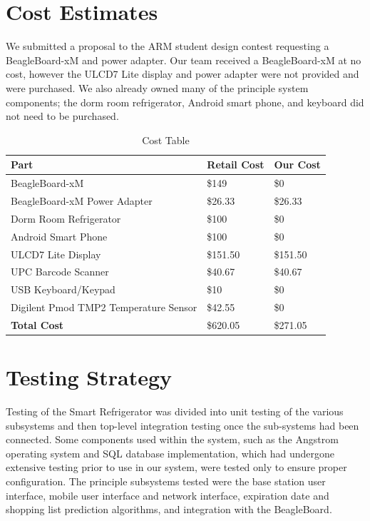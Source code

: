\documentclass[11pt]{article} %
\begin{document}
\section{Cost Estimates}
We submitted a proposal to the ARM student design contest requesting a BeagleBoard-xM and power adapter. Our team received a BeagleBoard-xM at no cost, however the ULCD7 Lite display and power adapter were not provided and were purchased. We also already owned many of the principle system components; the dorm room refrigerator, Android smart phone, and keyboard did not need to be purchased.
\begin{table}[h!]
\vspace{0.5cm}
\begin{center}
\caption{Cost Table}
\label{tab:cost}
\begin{tabular}{| p{3.0in} | p{1.5in} |p{1.5in} |}
\hline
Part & Retail Cost & Our Cost \\
\hline
BeagleBoard-xM & \$149 & \$0 \\
\hline
BeagleBoard-xM Power Adapter & \$26.33 & \$26.33 \\
\hline
Dorm Room Refrigerator & \$100 & \$0 \\
\hline
Android Smart Phone & \$100 & \$0  \\
\hline
ULCD7 Lite Display & \$151.50  & \$151.50 \\
\hline
UPC Barcode Scanner & \$40.67 & \$40.67 \\
\hline
USB Keyboard/Keypad & \$10 & \$0 \\
\hline
Digilent Pmod TMP2 Temperature Sensor & \$42.55 & \$0 \\
\hline
\hline
\textbf{Total Cost} & \$620.05 & \$271.05 \\
\hline
\end{tabular}
\end{center}
\end{table}

\section{Testing Strategy}
Testing of the Smart Refrigerator was divided into unit testing of the various subsystems and then top-level integration testing once the sub-systems had been connected. Some components used within the system, such as the Angstrom operating system and SQL database implementation, which had undergone extensive testing prior to use in our system, were tested only to ensure proper configuration. The principle subsystems tested were the base station user interface, mobile user interface and network interface, expiration date and shopping list prediction algorithms, and integration with the BeagleBoard.
\end{document}
